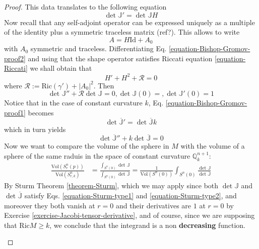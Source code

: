 \begin{proof}
This data translates to the following
equation
\begin{equation}
\label{equation-Bishop-Gromov-proof1}
\det\mathbb{J}'=\det\mathbb{J}H
\end{equation}
Now recall that any self-adjoint operator can
be expressed uniquely as a
multiple of the identity plus a symmetric
traceless matrix (ref?). This allows
to write
\begin{equation}
\label{equation-Bishop-Gromov-proof2}
A=H\text{Id}+A_0
\end{equation}
with $A_0$ symmetric and traceless.
Differentiating Eq.
\ref{equation-Bishop-Gromov-proof2} and using
that the shape operator satisfies
Riccati equation \ref{equation-Riccati} we
shall obtain that
$$
H'+H^2+\mathcal{R}=0
$$
where
$\mathcal{R}:=\text{Ric}(\gamma')+|A_0|^2$.
Then
\begin{equation}
\label{equation-Sturm-type1}
\det\mathbb{J}''+\mathcal{R}\det\mathbb{J}=0,
\det\mathbb{J}(0)=,\det\mathbb{J}'(0)=1
\end{equation}
\bigskip
Notice that in the case of constant curvature
$k$, Eq.
\ref{equation-Bishop-Gromov-proof1} becomes
\begin{equation}
\label{equation-Bishop-Gromov-proof3}
\det\overline{\mathbb{J}}'=
\det\overline{\mathbb{J}}k
\end{equation}
which in turn yields
\begin{equation}
\label{equation-Sturm-type2}
\det\overline{\mathbb{J}}''+
k\det\overline{\mathbb{J}}=0
\end{equation}
Now we want to compare the volume of the
sphere in $M$ with the volume of a
sphere of the same raduis in the space of
constant curvature
$\mathbb{Q}_k^{n+1}$:
$$
\begin{aligned}
\frac{\text{Vol}(S_r^{n}(p))}{\text{Vol}
(S^{n}_{r,k})}&=
\frac{\int_{S^n(0)}\det
\mathbb{J}}{\int_{S^n(0)}
\det\overline{\mathbb{J}}}
=\frac{1}{\text{Vol}(S^n(0))}
\int_{S^n(0)}\frac{\det\mathbb{J}}
{\det\overline{\mathbb{J}}}
\end{aligned}
$$
By Sturm Theorem \ref{theorem-Sturm}, which
we may apply since both
$\det\mathbb{J}$ and
$\det\overline{\mathbb{J}}$ satisfy Eqs.
 \ref{equation-Sturm-type1} and
 \ref{equation-Sturm-type2}, and moreover
they both vanish at $r=0$ and their
derivatives are $1$ at $r=0$ by Exercise
\ref{exercise-Jacobi-tensor-derivative}, and
of course, since we are supposing
that $\text{Ric}M\geq k$, we conclude that
the integrand is a non {\bf
decreasing} function.
\begin{remark}[Pregunta]

\end{remark}
\end{proof}
